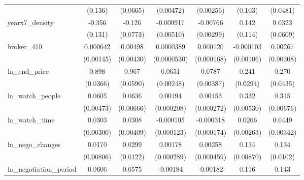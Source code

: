 {\begin{tabular}{l*{6}{c}}
            &     (0.136)         &    (0.0665)         &   (0.00472)         &   (0.00256)         &     (0.103)         &    (0.0481)         \\
\addlinespace
yearx7\_density&      -0.356\sym{***}&      -0.126         &   -0.000917         &    -0.00766\sym{**} &       0.142         &      0.0323         \\
            &     (0.131)         &    (0.0773)         &   (0.00510)         &   (0.00299)         &     (0.114)         &    (0.0609)         \\
\addlinespace
broker\_410  &    0.000642         &     0.00498         &   0.0000389         &    0.000120         &   -0.000103         &     0.00267         \\
            &   (0.00145)         &   (0.00430)         & (0.0000530)         &  (0.000168)         &   (0.00106)         &   (0.00308)         \\
\addlinespace
ln\_end\_price&       0.898\sym{***}&       0.967\sym{***}&      0.0651\sym{***}&      0.0787\sym{***}&       0.241\sym{***}&       0.270\sym{***}\\
            &    (0.0366)         &    (0.0590)         &   (0.00248)         &   (0.00387)         &    (0.0294)         &    (0.0435)         \\
\addlinespace
ln\_watch\_people&      0.0605\sym{***}&      0.0636\sym{***}&     0.00194\sym{***}&     0.00153\sym{***}&       0.332\sym{***}&       0.315\sym{***}\\
            &   (0.00473)         &   (0.00666)         &  (0.000208)         &  (0.000272)         &   (0.00530)         &   (0.00676)         \\
\addlinespace
ln\_watch\_time&      0.0303\sym{***}&      0.0308\sym{***}&   -0.000105         &   -0.000318\sym{*}  &      0.0266\sym{***}&      0.0449\sym{***}\\
            &   (0.00300)         &   (0.00409)         &  (0.000123)         &  (0.000174)         &   (0.00263)         &   (0.00342)         \\
\addlinespace
ln\_nego\_changes&      0.0170\sym{**} &      0.0299\sym{**} &     0.00178\sym{***}&     0.00258\sym{***}&       0.134\sym{***}&       0.134\sym{***}\\
            &   (0.00806)         &    (0.0122)         &  (0.000289)         &  (0.000459)         &   (0.00870)         &    (0.0102)         \\
\addlinespace
ln\_negotiation\_period&      0.0606\sym{***}&      0.0575\sym{***}&    -0.00184\sym{***}&    -0.00182\sym{***}&       0.116\sym{***}&       0.143\sym{***}\\

\end{tabular}}
